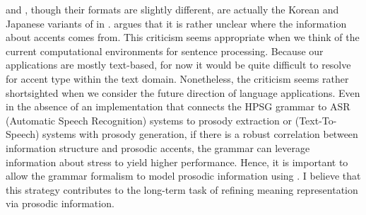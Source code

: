 


 and , though
their formats are slightly different, are actually the Korean and
Japanese variants of  in
.  \citet{bildhauer:07} argues that it is rather unclear
where the information about accents comes from.  This criticism seems
appropriate when we think of the current computational environments
for sentence processing. Because our applications are mostly
text-based, for now it would be quite difficult to resolve for accent
type within the text domain. Nonetheless, the criticism seems rather
shortsighted when we consider the future direction of language
applications. Even in the absence of an implementation that
connects the HPSG grammar to ASR (Automatic Speech Recognition)
systems to prosody extraction or  (Text-To-Speech) systems
with prosody generation, if there is a robust correlation
between information structure and prosodic accents, the grammar can
leverage information about stress to yield higher performance. Hence,
it is important to allow the grammar formalism to model prosodic
information using  \citep{kuhn:96}. I believe
that this strategy contributes to the long-term task of refining
meaning representation via prosodic information.



